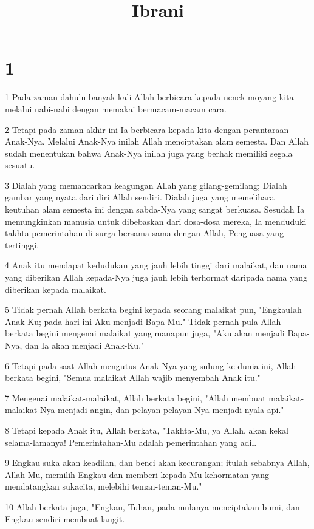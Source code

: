 

\title{Ibrani}


\chapter{1}

\par 1 Pada zaman dahulu banyak kali Allah berbicara kepada nenek moyang kita melalui nabi-nabi dengan memakai bermacam-macam cara.
\par 2 Tetapi pada zaman akhir ini Ia berbicara kepada kita dengan perantaraan Anak-Nya. Melalui Anak-Nya inilah Allah menciptakan alam semesta. Dan Allah sudah menentukan bahwa Anak-Nya inilah juga yang berhak memiliki segala sesuatu.
\par 3 Dialah yang memancarkan keagungan Allah yang gilang-gemilang; Dialah gambar yang nyata dari diri Allah sendiri. Dialah juga yang memelihara keutuhan alam semesta ini dengan sabda-Nya yang sangat berkuasa. Sesudah Ia memungkinkan manusia untuk dibebaskan dari dosa-dosa mereka, Ia menduduki takhta pemerintahan di surga bersama-sama dengan Allah, Penguasa yang tertinggi.
\par 4 Anak itu mendapat kedudukan yang jauh lebih tinggi dari malaikat, dan nama yang diberikan Allah kepada-Nya juga jauh lebih terhormat daripada nama yang diberikan kepada malaikat.
\par 5 Tidak pernah Allah berkata begini kepada seorang malaikat pun, "Engkaulah Anak-Ku; pada hari ini Aku menjadi Bapa-Mu." Tidak pernah pula Allah berkata begini mengenai malaikat yang manapun juga, "Aku akan menjadi Bapa-Nya, dan Ia akan menjadi Anak-Ku."
\par 6 Tetapi pada saat Allah mengutus Anak-Nya yang sulung ke dunia ini, Allah berkata begini, "Semua malaikat Allah wajib menyembah Anak itu."
\par 7 Mengenai malaikat-malaikat, Allah berkata begini, "Allah membuat malaikat-malaikat-Nya menjadi angin, dan pelayan-pelayan-Nya menjadi nyala api."
\par 8 Tetapi kepada Anak itu, Allah berkata, "Takhta-Mu, ya Allah, akan kekal selama-lamanya! Pemerintahan-Mu adalah pemerintahan yang adil.
\par 9 Engkau suka akan keadilan, dan benci akan kecurangan; itulah sebabnya Allah, Allah-Mu, memilih Engkau dan memberi kepada-Mu kehormatan yang mendatangkan sukacita, melebihi teman-teman-Mu."
\par 10 Allah berkata juga, "Engkau, Tuhan, pada mulanya menciptakan bumi, dan Engkau sendiri membuat langit.
